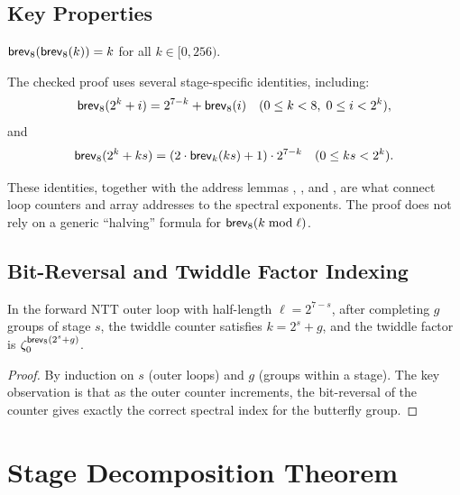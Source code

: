 \subsection{Key Properties}

\begin{lemma}
  $\mathsf{brev}_8(\mathsf{brev}_8(k)) = k$ for all $k \in [0, 256)$.
\label{lem:brev_invol}
\end{lemma}

\begin{lemma}
  The checked proof uses several stage-specific identities, including:
  \[
    \mathsf{brev}_8(2^k + i) = 2^{7-k} + \mathsf{brev}_8(i)
    \quad (0 \le k < 8,\; 0 \le i < 2^k),
  \]
  and
  \[
    \mathsf{brev}_8(2^k + ks) =
      (2 \cdot \mathsf{brev}_k(ks) + 1) \cdot 2^{7-k}
    \quad (0 \le ks < 2^k).
  \]
\label{lem:brev_stage}
\end{lemma}

These identities, together with the address lemmas
, , and
, are what connect loop counters and array addresses
to the spectral exponents.  The proof does not rely on a generic
``halving'' formula for \(\mathsf{brev}_8(k \bmod \ell)\).

\subsection{Bit-Reversal and Twiddle Factor Indexing}

\begin{lemma}
  In the forward NTT outer loop with half-length $\ell = 2^{7-s}$, after
  completing $g$ groups of stage $s$, the twiddle counter satisfies
  $k = 2^s + g$, and the twiddle factor is $\zeta_0^{\mathsf{brev}_8(2^s + g)}$.
\label{lem:twiddle_index}
\end{lemma}

\begin{proof}
  By induction on $s$ (outer loops) and $g$ (groups within a stage).
  The key observation is that as the outer counter increments,
  the bit-reversal of the counter gives exactly the correct spectral index
  for the butterfly group.
\end{proof}

\section{Stage Decomposition Theorem}

